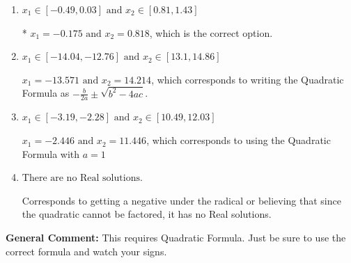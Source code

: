 \documentclass{extbook}[14pt]
\begin{document}
\begin{enumerate}
{\begin{enumerate}[label=\Alph*.]
 $x_1 = -0.818 \text{ and } x_2 = 0.175$, which corresponds to writing the Quadratic Formula as $\frac{b \pm \sqrt{b^2 - 4ac}}{2a}$
\item \( x_1 \in [-0.49, 0.03] \text{ and } x_2 \in [0.81, 1.43] \)

* $x_1 = -0.175 \text{ and } x_2 = 0.818$, which is the correct option.
\item \( x_1 \in [-14.04, -12.76] \text{ and } x_2 \in [13.1, 14.86] \)

 $x_1 = -13.571 \text{ and } x_2 = 14.214$, which corresponds to writing the Quadratic Formula as $-\frac{b}{2a} \pm \sqrt{b^2 - 4ac}$.
\item \( x_1 \in [-3.19, -2.28] \text{ and } x_2 \in [10.49, 12.03] \)

 $x_1 = -2.446 \text{ and } x_2 = 11.446$, which corresponds to using the Quadratic Formula with $a=1$
\item \( \text{There are no Real solutions.} \)

Corresponds to getting a negative under the radical or believing that since the quadratic cannot be factored, it has no Real solutions.
\end{enumerate}

\textbf{General Comment:} This requires Quadratic Formula. Just be sure to use the correct formula and watch your signs.
}
\end{enumerate}
\end{document}
